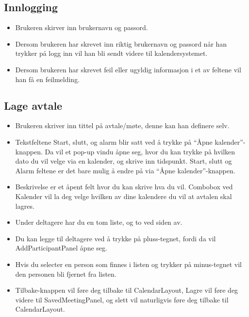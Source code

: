 
\subsection{Innlogging}
\begin{itemize}
  \item Brukeren skirver inn brukernavn og passord.
  \item Dersom brukeren har skrevet inn riktig brukernavn og passord når han trykker på logg inn vil han bli sendt videre til kalendersystemet.
  \item Dersom brukeren har skrevet feil eller ugyldig informasjon i et av feltene vil han få en feilmelding.
\end{itemize}

\subsection{Lage avtale}
\begin{itemize}
  \item Brukeren skriver inn tittel på avtale/møte, denne kan han definere selv. 
\item Tekstfeltene Start, slutt, og alarm blir satt ved å trykke på “Åpne kalender”-knappen. Da vil et pop-up vindu åpne seg, hvor du kan trykke på hvilken dato du vil velge via en kalender, og skrive inn tidspunkt. Start, slutt og Alarm feltene er det bare mulig å endre på via “Åpne kalender”-knappen.
 \item Beskrivelse er et åpent felt hvor du kan skrive hva du vil.
Combobox ved Kalender vil la deg velge hvilken av dine kalendere du vil at avtalen skal lagres. 
\item Under deltagere har du en tom liste, og to ved siden av. 
\item Du kan legge til deltagere ved å trykke på pluss-tegnet, fordi da vil AddParticipantPanel åpne seg.
\item Hvis du selecter en person som finnes i listen og trykker på minus-tegnet vil den personen bli fjernet fra listen. 
\item Tilbake-knappen vil føre deg tilbake til CalendarLayout, Lagre vil føre deg videre til SavedMeetingPanel, og slett vil naturligvis føre deg tilbake til CalendarLayout.
\end{itemize}

